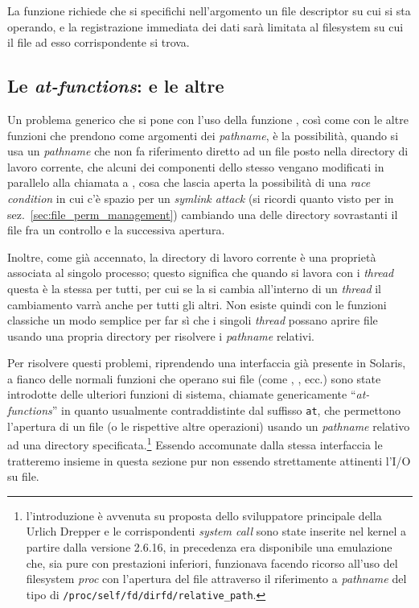 La funzione richiede che si specifichi nell'argomento  un file
descriptor su cui si sta operando, e la registrazione immediata dei dati sarà
limitata al filesystem su cui il file ad esso corrispondente si trova.


\subsection{Le \textit{at-functions}:  e le altre}
\label{sec:file_openat}


Un problema generico che si pone con l'uso della funzione , così
come con le altre funzioni che prendono come argomenti dei \textit{pathname},
è la possibilità, quando si usa un \textit{pathname} che non fa riferimento
diretto ad un file posto nella directory di lavoro corrente, che alcuni dei
componenti dello stesso vengano modificati in parallelo alla chiamata a
, cosa che lascia aperta la possibilità di una \textit{race
  condition} in cui c'è spazio per un \textit{symlink attack} (si ricordi
quanto visto per  in sez.~\ref{sec:file_perm_management})
cambiando una delle directory sovrastanti il file fra un controllo e la
successiva apertura. 

Inoltre, come già accennato, la directory di lavoro corrente è una proprietà
associata al singolo processo; questo significa che quando si lavora con i
\textit{thread} questa è la stessa per tutti, per cui se la si cambia
all'interno di un \textit{thread} il cambiamento varrà anche per tutti gli
altri. Non esiste quindi con le funzioni classiche un modo semplice per far sì
che i singoli \textit{thread} possano aprire file usando una propria directory
per risolvere i \textit{pathname} relativi.

Per risolvere questi problemi, riprendendo una interfaccia già presente in
Solaris, a fianco delle normali funzioni che operano sui file (come
, , ecc.) sono state introdotte delle ulteriori
funzioni di sistema, chiamate genericamente ``\textit{at-functions}'' in
quanto usualmente contraddistinte dal suffisso \texttt{at}, che permettono
l'apertura di un file (o le rispettive altre operazioni) usando un
\textit{pathname} relativo ad una directory
specificata.\footnote{l'introduzione è avvenuta su proposta dello sviluppatore
  principale della  Urlich Drepper e le corrispondenti
  \textit{system call} sono state inserite nel kernel a partire dalla versione
  2.6.16, in precedenza era disponibile una emulazione che, sia pure con
  prestazioni inferiori, funzionava facendo ricorso all'uso del filesystem
  \textit{proc} con l'apertura del file attraverso il riferimento a
  \textit{pathname} del tipo di \texttt{/proc/self/fd/dirfd/relative\_path}.}
Essendo accomunate dalla stessa interfaccia le tratteremo insieme in questa
sezione pur non essendo strettamente attinenti l'I/O su file.


